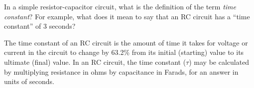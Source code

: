 

In a simple resistor-capacitor circuit, what is the definition of the term {\it time constant}?  For example, what does it mean to say that an RC circuit has a ``time constant'' of 3 seconds?







The time constant of an RC circuit is the amount of time it takes for voltage or current in the circuit to change by 63.2\% from its initial (starting) value to its ultimate (final) value.  In an RC circuit, the time constant ($\tau$) may be calculated by multiplying resistance in ohms by capacitance in Farads, for an answer in units of seconds.












